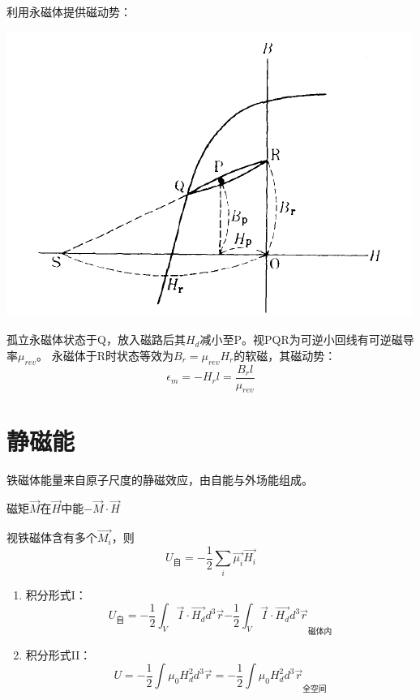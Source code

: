 利用永磁体提供磁动势：
\begin{center}
        \includegraphics[scale=0.7]{images/1_5.png}
\end{center}

孤立永磁体状态于Q，放入磁路后其$H_d$减小至P。视PQR为可逆小回线有可逆磁导率$\mu_{rev}$。
永磁体于R时状态等效为$B_r=\mu_{rev}H_r$的软磁，其磁动势：
\[ \epsilon_m = -H_rl = \frac{B_rl}{\mu_{rev}} \]



\section{静磁能}
铁磁体能量来自原子尺度的静磁效应，由自能与外场能组成。
\begin{definition}[自能]
    磁矩$\vec{M}$在$\vec{H}$中能$-\vec{M} \cdot \vec{H}$

    视铁磁体含有多个$\vec{M_i}$，则
    \[U_\text{自}=-\frac{1}{2}\sum_i\vec{\mu_i}\vec{H_i}\]

    \begin{enumerate}
        \item 积分形式I：
        \[U_\text{自}=-\frac{1}{2}\int_V\vec{I} \cdot\vec{H_d} d^3\vec{r} 
        {-\frac{1}{2}\int_V\vec{I} \cdot\vec{H_d} d^3\vec{r}}_\text{磁体内}\]
        \item 积分形式II：
        \[U = -\frac{1}{2}\int\mu_0 H_d^2 d^3\vec{r}
        {=-\frac{1}{2}\int\mu_0 H_d^2 d^3\vec{r}}_\text{全空间}\]
    \end{enumerate}
\end{definition}

